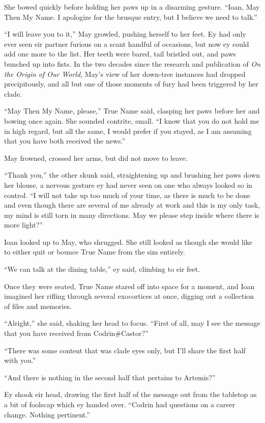 She bowed quickly before holding her paws up in a disarming gesture. ``Ioan, May Then My Name. I apologize for the brusque entry, but I believe we need to talk.''

``I will leave you to it,'' May growled, pushing herself to her feet. Ey had only ever seen eir partner furious on a scant handful of occasions, but now ey could add one more to the list. Her teeth were bared, tail bristled out, and paws bunched up into fists. In the two decades since the research and publication of \emph{On the Origin of Our World}, May's view of her down-tree instances had dropped precipitously, and all but one of those moments of fury had been triggered by her clade.

``May Then My Name, please,'' True Name said, clasping her paws before her and bowing once again. She sounded contrite, small. ``I know that you do not hold me in high regard, but all the same, I would prefer if you stayed, as I am assuming that you have both received the news.''

May frowned, crossed her arms, but did not move to leave.

``Thank you,'' the other skunk said, straightening up and brushing her paws down her blouse, a nervous gesture ey had never seen on one who always looked so in control. ``I will not take up too much of your time, as there is much to be done and even though there are several of me already at work and this is my only task, my mind is still torn in many directions. May we please step inside where there is more light?''

Ioan looked up to May, who shrugged. She still looked as though she would like to either quit or bounce True Name from the sim entirely.

``We can talk at the dining table,'' ey said, climbing to eir feet.

Once they were seated, True Name stared off into space for a moment, and Ioan imagined her rifling through several exocortices at once, digging out a collection of files and memories.

``Alright,'' she said, shaking her head to focus. ``First of all, may I see the message that you have received from Codrin\#Castor?''

``There was some content that was clade eyes only, but I'll share the first half with you.''

``And there is nothing in the second half that pertains to Artemis?''

Ey shook eir head, drawing the first half of the message out from the tabletop as a bit of foolscap which ey handed over. ``Codrin had questions on a career change. Nothing pertinent.''

